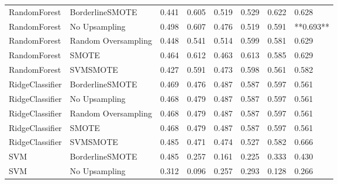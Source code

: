 \begin{tabular}{llllllll}
                RandomForest &     BorderlineSMOTE & 0.441 &                     0.605 &                 0.519 &                  0.529 &                                   0.622 &     0.628 \\
                RandomForest &       No Upsampling & 0.498 &                     0.607 &                 0.476 &                  0.519 &                                   0.591 & **0.693** \\
                RandomForest & Random Oversampling & 0.448 &                     0.541 &                 0.514 &                  0.599 &                                   0.581 &     0.629 \\
                RandomForest &               SMOTE & 0.464 &                     0.612 &                 0.463 &                  0.613 &                                   0.585 &     0.629 \\
                RandomForest &            SVMSMOTE & 0.427 &                     0.591 &                 0.473 &                  0.598 &                                   0.561 &     0.582 \\
             RidgeClassifier &     BorderlineSMOTE & 0.469 &                     0.476 &                 0.487 &                  0.587 &                                   0.597 &     0.561 \\
             RidgeClassifier &       No Upsampling & 0.468 &                     0.479 &                 0.487 &                  0.587 &                                   0.597 &     0.561 \\
             RidgeClassifier & Random Oversampling & 0.468 &                     0.479 &                 0.487 &                  0.587 &                                   0.597 &     0.561 \\
             RidgeClassifier &               SMOTE & 0.468 &                     0.479 &                 0.487 &                  0.587 &                                   0.597 &     0.561 \\
             RidgeClassifier &            SVMSMOTE & 0.485 &                     0.471 &                 0.474 &                  0.527 &                                   0.582 &     0.666 \\
                         SVM &     BorderlineSMOTE & 0.485 &                     0.257 &                 0.161 &                  0.225 &                                   0.333 &     0.430 \\
                         SVM &       No Upsampling & 0.312 &                     0.096 &                 0.257 &                  0.293 &                                   0.128 &     0.266 \\

\end{tabular}
